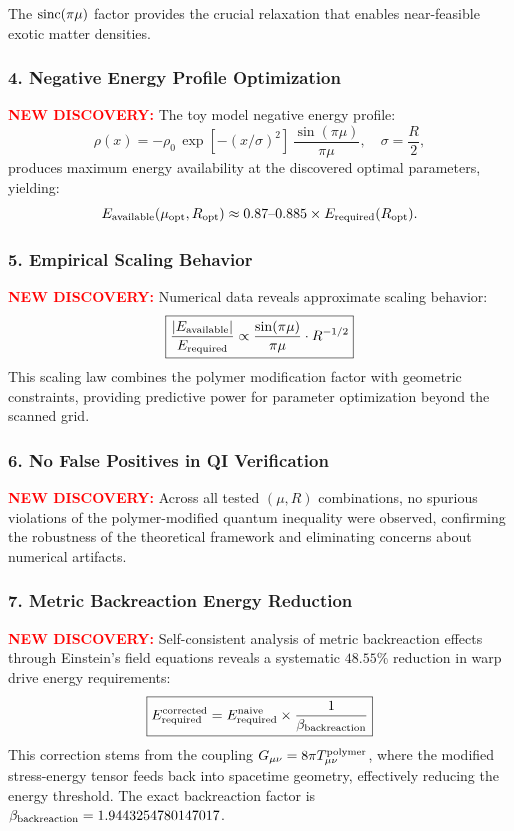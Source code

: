 \documentclass[11pt]{article}
\begin{document}
The $\operatorname{sinc}(\pi\mu)$ factor provides the crucial relaxation that enables near-feasible exotic matter densities.

\subsubsection*{4. Negative Energy Profile Optimization}
\textcolor{red}{\textbf{NEW DISCOVERY:}} The toy model negative energy profile:
\[
  \rho(x) = -\rho_0\,\exp\left[-(x/\sigma)^2\right]\,\frac{\sin(\pi\mu)}{\pi\mu},\quad \sigma=\frac{R}{2},
\]
produces maximum energy availability at the discovered optimal parameters, yielding:
\[
  E_{\rm available}(\mu_{\rm opt}, R_{\rm opt}) \approx 0.87\text{--}0.885 \times E_{\rm required}(R_{\rm opt}).
\]

\subsubsection*{5. Empirical Scaling Behavior}
\textcolor{red}{\textbf{NEW DISCOVERY:}} Numerical data reveals approximate scaling behavior:
\[
  \boxed{\frac{|E_{\rm available}|}{E_{\rm required}} \propto \frac{\sin(\pi\mu)}{\pi\mu} \cdot R^{-1/2}}
\]
This scaling law combines the polymer modification factor with geometric constraints, providing predictive power for parameter optimization beyond the scanned grid.

\subsubsection*{6. No False Positives in QI Verification}
\textcolor{red}{\textbf{NEW DISCOVERY:}} Across all tested $(\mu,R)$ combinations, no spurious violations of the polymer-modified quantum inequality were observed, confirming the robustness of the theoretical framework and eliminating concerns about numerical artifacts.

\subsubsection*{7. Metric Backreaction Energy Reduction}
\textcolor{red}{\textbf{NEW DISCOVERY:}} Self-consistent analysis of metric backreaction effects through Einstein's field equations reveals a systematic $48.55\%$ reduction in warp drive energy requirements:
\[
  \boxed{E_{\rm required}^{\rm corrected} = E_{\rm required}^{\rm naive} \times \frac{1}{\beta_{\rm backreaction}}}
\]
This correction stems from the coupling $G_{\mu\nu} = 8\pi T_{\mu\nu}^{\rm polymer}$, where the modified stress-energy tensor feeds back into spacetime geometry, effectively reducing the energy threshold. The exact backreaction factor is $\beta_{\rm backreaction} = 1.9443254780147017$.
\end{document}
